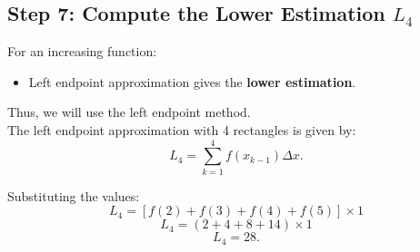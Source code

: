 \documentclass{article}
\begin{document}
\subsection*{Step 7: Compute the Lower Estimation \( L_4 \)}
For an increasing function:
\begin{itemize}
    \item Left endpoint approximation gives the \textbf{lower estimation}.
\end{itemize}
Thus, we will use the left endpoint method.\\

The left endpoint approximation with 4 rectangles is given by:
\[
L_4 = \sum_{k=1}^4 f(x_{k-1}) \Delta x.
\]

Substituting the values:
\[
L_4 = [f(2) + f(3) + f(4) + f(5)] \times 1
\]
\[
L_4 = (2 + 4 + 8 + 14) \times 1
\]
\[
L_4 = 28.
\]
\end{document}
